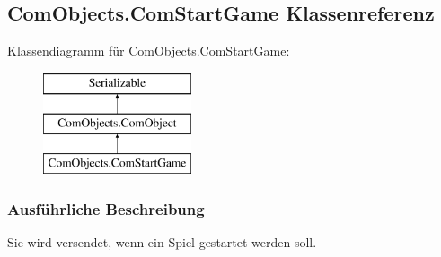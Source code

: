 \hypertarget{a00032}{\subsection{Com\-Objects.\-Com\-Start\-Game Klassenreferenz}
\label{a00032}
}
Klassendiagramm für Com\-Objects.\-Com\-Start\-Game\-:\begin{figure}[H]
\begin{center}
\leavevmode
\includegraphics[height=3.000000cm]{a00032}
\end{center}
\end{figure}


\subsubsection{Ausführliche Beschreibung}
Sie wird versendet, wenn ein Spiel gestartet werden soll. 